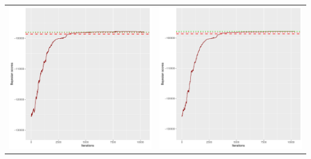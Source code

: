 \documentclass[]{scrartcl}
\begin{document}
\begin{table}[h!]
\begin{tabular}{cc}
\includegraphics[scale = 0.4]{./figs/hepar2/v5/25/bayBoundsEvolution-10352.pdf} & 
\includegraphics[scale = 0.4]{./figs/hepar2/v5/50/bayBoundsEvolution-10352.pdf} \\

\end{tabular}
\end{table}
\end{document}
